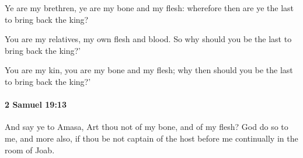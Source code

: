 			\begin{versebox}
					\item[BHS] 
					\item[ASV] Ye are my brethren, ye are my bone and my flesh: wherefore then are ye the last to bring back the king?
					\item[NIV] You are my relatives, my own flesh and blood. So why should you be the last to bring back the king?’
					\item[NRSV] You are my kin, you are my bone and my flesh; why then should you be the last to bring back the king?’
			\end{versebox}

		\paragraph{2 Samuel 19:13} %
			\label{2SAMUEL-19-13}

			And say ye to Amasa, Art thou not of my bone, and of my flesh? God do so to me, and more also, if thou be not captain of the host before me continually in the room of Joab.

